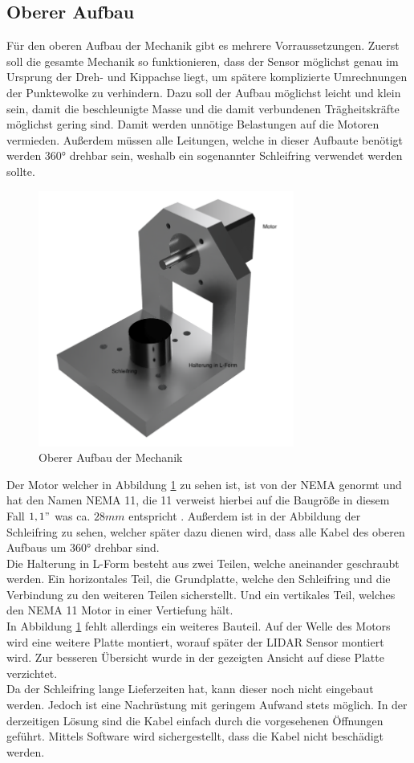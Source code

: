 \subsection{Oberer Aufbau}
Für den oberen Aufbau der Mechanik gibt es mehrere Vorraussetzungen. Zuerst soll die gesamte Mechanik so funktionieren, dass der Sensor möglichst genau im Ursprung der Dreh- und Kippachse liegt, um spätere komplizierte Umrechnungen der Punktewolke zu verhindern. Dazu soll der Aufbau möglichst leicht und klein sein, damit die beschleunigte Masse und die damit verbundenen Trägheitskräfte möglichst gering sind. Damit werden unnötige Belastungen auf die Motoren vermieden. Außerdem müssen alle Leitungen, welche in dieser Aufbaute benötigt werden 360° drehbar sein, weshalb ein sogenannter Schleifring verwendet werden sollte. 
\begin{figure}[H]
	\centering
	\includegraphics[width=0.75\textwidth]{images/Mechanik/ObererAufbau}
	\caption{Oberer Aufbau der Mechanik}
	\label{obereraufbau}
\end{figure}
Der Motor welcher in Abbildung \ref{obereraufbau} zu sehen ist, ist von der \ac{NEMA} genormt und hat den Namen \ac{NEMA} 11, die 11 verweist hierbei auf die Baugröße in diesem Fall $1,1"$ was ca. $28mm$ entspricht \cite{NEMA}. Außerdem ist in der Abbildung der Schleifring zu sehen, welcher später dazu dienen wird, dass alle Kabel des oberen Aufbaus um 360° drehbar sind. \\
Die Halterung in L-Form besteht aus zwei Teilen, welche aneinander geschraubt werden. Ein horizontales Teil, die Grundplatte, welche den Schleifring und die Verbindung zu den weiteren Teilen sicherstellt. Und ein vertikales Teil, welches den \ac{NEMA} 11 Motor in einer Vertiefung hält.\\
In Abbildung \ref{obereraufbau} fehlt allerdings ein weiteres Bauteil. Auf der Welle des Motors wird eine weitere Platte montiert, worauf später der \ac{LIDAR} Sensor montiert wird. Zur besseren Übersicht wurde in der gezeigten Ansicht auf diese Platte verzichtet.\\
Da der Schleifring lange Lieferzeiten hat, kann dieser noch nicht eingebaut werden. Jedoch ist eine Nachrüstung mit geringem Aufwand stets möglich. In der derzeitigen Lösung sind die Kabel einfach durch die vorgesehenen Öffnungen geführt. Mittels Software wird sichergestellt, dass die Kabel nicht beschädigt werden. 
